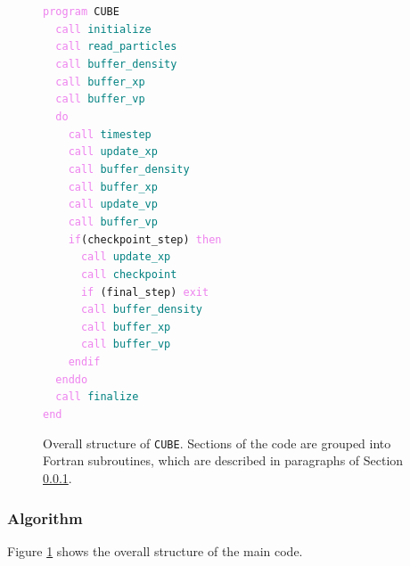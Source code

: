 \documentclass[10pt,twocolumn,preprint]{emulateapj}
\newcommand{\tcv}{\textcolor{violet}}
\newcommand{\tcx}{\textcolor{teal}}
\begin{document}
\begin{figure}[]
{\tt \tcv{program} CUBE\\
\indent \ \ \tcv{call} \tcx{initialize}\\
\indent \ \ \tcv{call} \tcx{read\_particles}\\
\indent \ \ \tcv{call} \tcx{buffer\_density}\\
\indent \ \ \tcv{call} \tcx{buffer\_xp}\\
\indent \ \ \tcv{call} \tcx{buffer\_vp}\\
\indent \ \ \tcv{do}\\
\indent \ \ \ \ \tcv{call} \tcx{timestep}\\
\indent \ \ \ \ \tcv{call} \tcx{update\_xp}\\
\indent \ \ \ \ \tcv{call} \tcx{buffer\_density}\\
\indent \ \ \ \ \tcv{call} \tcx{buffer\_xp}\\
\indent \ \ \ \ \tcv{call} \tcx{update\_vp}\\
\indent \ \ \ \ \tcv{call} \tcx{buffer\_vp}\\
\indent \ \ \ \ \tcv{if}(checkpoint\_step) \tcv{then}\\
\indent \ \ \ \ \ \ \tcv{call} \tcx{update\_xp}\\
\indent \ \ \ \ \ \ \tcv{call} \tcx{checkpoint}\\
\indent \ \ \ \ \ \ \tcv{if} (final\_step) \tcv{exit}\\
\indent \ \ \ \ \ \ \tcv{call} \tcx{buffer\_density}\\
\indent \ \ \ \ \ \ \tcv{call} \tcx{buffer\_xp}\\
\indent \ \ \ \ \ \ \tcv{call} \tcx{buffer\_vp}\\
\indent \ \ \ \ \tcv{endif}\\
\indent \ \ \tcv{enddo}\\
\indent \ \ \tcv{call} \tcx{finalize}\\
\tcv{end}\\}
\caption{Overall structure of {\tt CUBE}. Sections of the code are grouped into Fortran subroutines, which are described in paragraphs of Section \ref{sss.algorithm}.}
\label{fig.code}
\end{figure}

\subsubsection{Algorithm}\label{sss.algorithm}
Figure \ref{fig.code} shows the overall structure of the main code.
\end{document}
